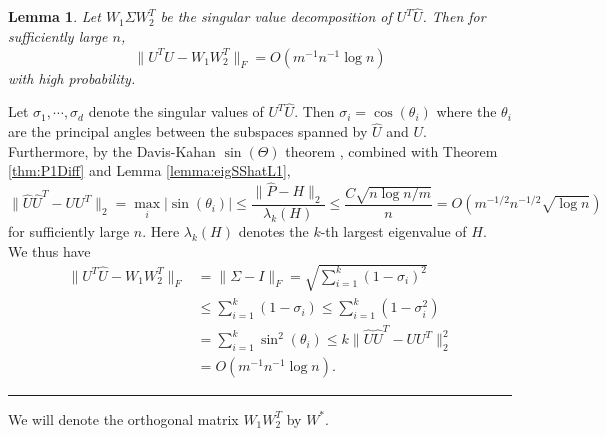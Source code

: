 \documentclass[a4paper]{article}
\newenvironment{proof}{{\bf Proof:  }}{\hfill\rule{2mm}{2mm}}
\newtheorem{lemma}[fact]{Lemma}
\begin{document}
\begin{lemma}
\label{lemma:AlmostOrthogonalL1}
Let $W_1 \Sigma W_2^T$ be the singular value decomposition of $U^T \hat{U}$. Then for sufficiently large $n$, 
\[
	\| U^T \hat{U} - W_1 W_2^T \|_F = O(m^{-1} n^{-1} \log n)
\]
with high probability.
\end{lemma}
\begin{proof}
Let $\sigma_1, \cdots, \sigma_d$ denote the singular values of $U^T \hat{U}$. Then $\sigma_i = \cos(\theta_i)$ where the $\theta_i$ are the principal angles between the subspaces spanned by $\hat{U}$ and $U$. Furthermore, by the Davis-Kahan $\sin(\Theta)$ theorem \cite{davis1970rotation}, combined with Theorem \ref{thm:P1Diff} and Lemma \ref{lemma:eigSShatL1},
\begin{equation}
\label{eqn:uhat2u2diffL1}
	\|\hat{U} \hat{U}^T - U U^T\|_2 = \max_i |\sin(\theta_i)|
    \le \frac{\|\hat{P} - H\|_2}{\lambda_k(H)}
    \le \frac{C \sqrt{n \log n/m}}{n} = O(m^{-1/2} n^{-1/2} \sqrt{\log n})
\end{equation}
for sufficiently large $n$. Here $\lambda_k(H)$ denotes the $k$-th largest eigenvalue of $H$.\\
We thus have
\begin{align*}
	\| U^T \hat{U} - W_1 W_2^T \|_F
    & = \| \Sigma - I \|_F
    = \sqrt{\sum_{i=1}^k (1-\sigma_i)^2} \\
    & \le \sum_{i=1}^k (1-\sigma_i) \le \sum_{i=1}^k (1-\sigma_i^2) \\
    & = \sum_{i=1}^k \sin^2(\theta_i)
    \le k \|\hat{U} \hat{U}^T - U U^T\|_2^2 \\
    & = O(m^{-1} n^{-1} \log n).
\end{align*}
\end{proof}

We will denote the orthogonal matrix $W_1 W_2^T$ by $W^*$.
\end{document}
